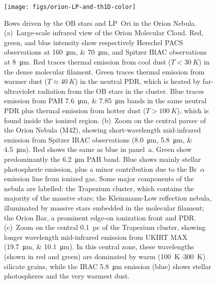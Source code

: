 \begin{figure}
  \centering
  \texttt{[image: figs/orion-LP-and-th1D-color]}
  \caption{Bows driven by the OB stars \thD{} and LP~Ori in the Orion
    Nebula.  (a)~Large-scale infrared view of the Orion Molecular
    Cloud.  Red, green, and blue intensity show respectively Herschel
    PACS observations at \SIlist{160; 70}{\um}, and Spitzer IRAC
    observations at \SI{8}{\um}.  Red traces thermal emission from
    cool dust (\(T < \SI{30}{K}\)) in the dense molecular filament.
    Green traces thermal emission from warmer dust
    (\(T \approx \SI{40}{K}\)) in the neutral PDR, which is heated by
    far-ultraviolet radiation from the OB stars in the cluster. Blue
    traces emission from PAH \SIlist{7.6;7.85}{\um} bands in the same
    neutral PDR plus thermal emission from hotter dust
    (\(T > \SI{100}{K}\)), which is found inside the ionized \hii{}
    region.  (b)~Zoom on the central parsec of the Orion Nebula (M42),
    showing short-wavelength mid-infrared emission from Spitzer IRAC
    observations (\SIlist{8.0;5.8;4.5}{\um}).  Red shows the same as
    blue in panel~a.  Green show predominantly the \SI{6.2}{\um} PAH
    band.  Blue shows mainly stellar photospheric emission, plus a
    minor contribution due to the Br~\(\alpha\) emission line from ionized
    gas. Some major components of the nebula are labelled: the
    Trapezium cluster, which contains the majority of the massive
    stars; the Kleinmann-Low reflection nebula, illuminated by massive
    stars embedded in the molecular filament; the Orion Bar, a
    prominent edge-on ionization front and PDR.  (c)~Zoom on the
    central \SI{0.1}{pc} of the Trapezium cluster, showing longer
    wavelength mid-infrared emission from UKIRT MAX
    (\SIlist{19.7;10.1}{\um}).  In this central zone, these
    wavelengths (shown in red and green) are dominated by warm
    (\SIrange{100}{300}{K}) silicate grains, while the IRAC
    \SI{5.8}{\um} emission (blue) shows stellar photospheres and the
    very warmest dust.}
  \label{fig:orion-bows}
\end{figure}

